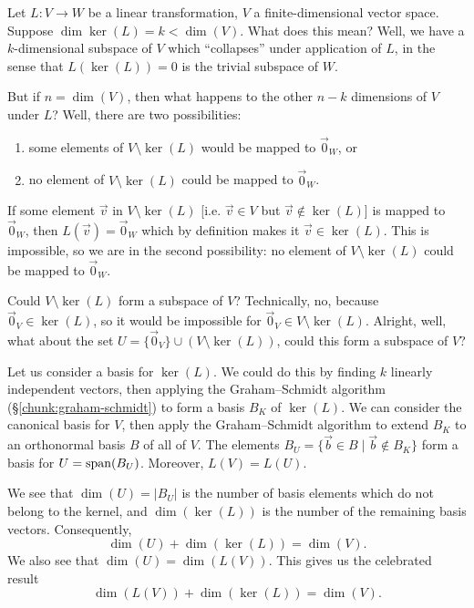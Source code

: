 Let $L\colon V\to W$ be a linear transformation, $V$ a
finite-dimensional vector space. Suppose $\dim\ker(L)=k<\dim(V)$.
What does this mean? Well, we have a $k$-dimensional subspace of $V$
which ``collapses'' under application of $L$, in the sense that
$L(\ker(L))=0$ is the trivial subspace of $W$.

But if $n=\dim(V)$, then what happens to the other $n-k$ dimensions of
$V$ under $L$? Well, there are two possibilities:
\begin{enumerate}
\item some elements of $V\setminus\ker(L)$ would be mapped to
  $\vec{0}_{W}$, or
\item no element of $V\setminus\ker(L)$ could be mapped to $\vec{0}_{W}$.
\end{enumerate}
If some element $\vec{v}$ in $V\setminus\ker(L)$ [i.e. $\vec{v}\in V$
  but $\vec{v}\notin\ker(L)$] is mapped to $\vec{0}_{W}$, then
$L(\vec{v})=\vec{0}_{W}$ which by definition makes it
$\vec{v}\in\ker(L)$. This is impossible, so we are in the second
possibility: no element of $V\setminus\ker(L)$ could be mapped to
$\vec{0}_{W}$.

Could $V\setminus\ker(L)$ form a subspace of $V$?
Technically, no, because $\vec{0}_{V}\in\ker(L)$, so it would be
impossible for $\vec{0}_{V}\in V\setminus\ker(L)$. Alright, well, what
about the set $U=\{\vec{0}_{V}\}\cup(V\setminus\ker(L))$, could this
form a subspace of $V$?

Let us consider a basis for $\ker(L)$. We could do this by finding $k$
linearly independent vectors, then applying the Graham--Schmidt
algorithm (\S\ref{chunk:graham-schmidt}) to form a basis $B_{K}$ of
$\ker(L)$. We can consider the canonical basis for $V$, then apply the
Graham--Schmidt algorithm to extend $B_{K}$ to an orthonormal basis $B$ of
all of $V$. The elements $B_{U}=\{\vec{b}\in B\mid\vec{b}\notin B_{K}\}$
form a basis for $U=\operatorname{span}(B_{U})$. Moreover, $L(V)=L(U)$.

We see that $\dim(U)=|B_{U}|$ is the number of basis elements which do
not belong to the kernel, and $\dim(\ker(L))$ is the number of the
remaining basis vectors. Consequently,
\begin{equation}
\dim(U) + \dim(\ker(L)) = \dim(V).
\end{equation}
We also see that $\dim(U)=\dim(L(V))$. This gives us the celebrated
result
\begin{equation}
\boxed{\dim(L(V)) + \dim(\ker(L)) = \dim(V).}
\end{equation}
